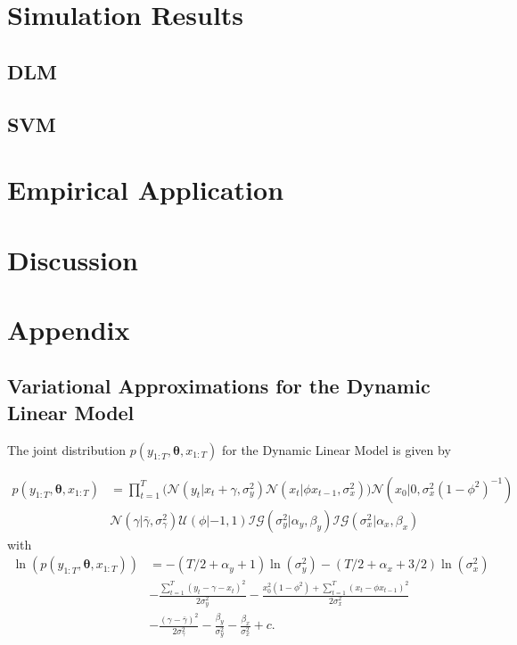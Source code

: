 \documentclass[12pt,a4paper]{article}%
\numberwithin{equation}{section}
\begin{document}
{{\section{Simulation Results}
\subsection{DLM}
\subsection{SVM}

\section{Empirical Application}

\section{Discussion}


\newpage
\section{Appendix}

\subsection{Variational Approximations for the Dynamic Linear Model}

The joint distribution $p(y_{1:T}, \boldsymbol{\theta}, x_{1:T})$ for the Dynamic Linear Model is given by

\begin{align}
p(y_{1:T}, \boldsymbol{\theta}, x_{1:T}) &= \prod_{t=1}^{T} \bigg( \mathcal{N}(y_t | x_t + \gamma, \sigma^2_y) \mathcal{N}(x_t | \phi x_{t-1}, \sigma^2_x) \bigg) \mathcal{N}(x_0 | 0, \sigma^2_x (1 - \phi^2)^{-1}) \nonumber \\
&\mathcal{N}(\gamma | \bar{\gamma}, \sigma^2_{\gamma}) \mathcal{U}(\phi | -1, 1) \mathcal{IG}(\sigma^2_y | \alpha_y, \beta_y)\mathcal{IG}(\sigma^2_x | \alpha_x, \beta_x) 
\end{align}
with 
\begin{align}
\ln(p(y_{1:T}, \boldsymbol{\theta}, x_{1:T})) &= -(T/2 + \alpha_y + 1) \ln(\sigma_y^2) -(T/2 + \alpha_x + 3/2) \ln(\sigma_x^2) \nonumber \\
&- \frac{\sum_{t=1}^{T}(y_t - \gamma - x_t)^2}{2 \sigma^2_y} - \frac{x_0^2(1 -\phi^2) + \sum_{t=1}^{T}(x_t - \phi x_{t-1})^2}{2 \sigma^2_x} \nonumber \\
&- \frac{(\gamma - \bar{\gamma})^2}{2 \sigma^2_{\gamma}} - \frac{\beta_y}{\sigma^2_y} - \frac{\beta_x}{\sigma^2_x} + c \label{logjoint}. 
\end{align}

}}
\end{document}
